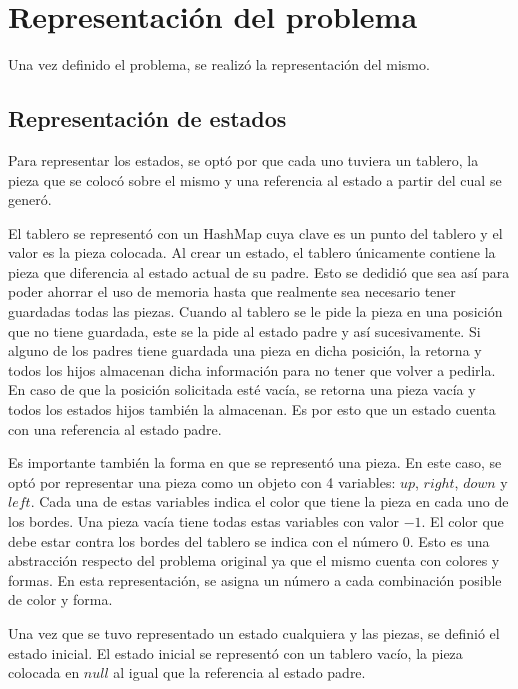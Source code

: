 \documentclass[11pt,twocolumn]{article}
\begin{document}
\section{Representación del problema}
\par Una vez definido el problema, se realizó la representación del mismo.
    \subsection{Representación de estados}
        \par Para representar los estados, se optó por que cada uno tuviera un tablero, la pieza que se colocó sobre el mismo y una referencia al estado a partir del cual se generó.
        \par El tablero se representó con un HashMap cuya clave es un punto del tablero y el valor es la pieza colocada. Al crear un estado, el tablero únicamente contiene la pieza que diferencia al estado actual de su padre. Esto se dedidió que sea así para poder ahorrar el uso de memoria hasta que realmente sea necesario tener guardadas todas las piezas. Cuando al tablero se le pide la pieza en una posición que no tiene guardada, este se la pide al estado padre y así sucesivamente. Si alguno de los padres tiene guardada una pieza en dicha posición, la retorna y todos los hijos almacenan dicha información para no tener que volver a pedirla. En caso de que la posición solicitada esté vacía, se retorna una pieza vacía y todos los estados hijos también la almacenan. Es por esto que un estado cuenta con una referencia al estado padre.
        \par Es importante también la forma en que se representó una pieza. En este caso, se optó por representar una pieza como un objeto con 4 variables: $up$, $right$, $down$ y $left$. Cada una de estas variables indica el color que tiene la pieza en cada uno de los bordes. Una pieza vacía tiene todas estas variables con valor $-1$. El color que debe estar contra los bordes del tablero se indica con el número $0$. Esto es una abstracción respecto del problema original ya que el mismo cuenta con colores y formas. En esta representación, se asigna un número a cada combinación posible de color y forma.
        \par Una vez que se tuvo representado un estado cualquiera y las piezas, se definió el estado inicial. El estado inicial se representó con un tablero vacío, la pieza colocada en $null$ al igual que la referencia al estado padre.
\end{document}
